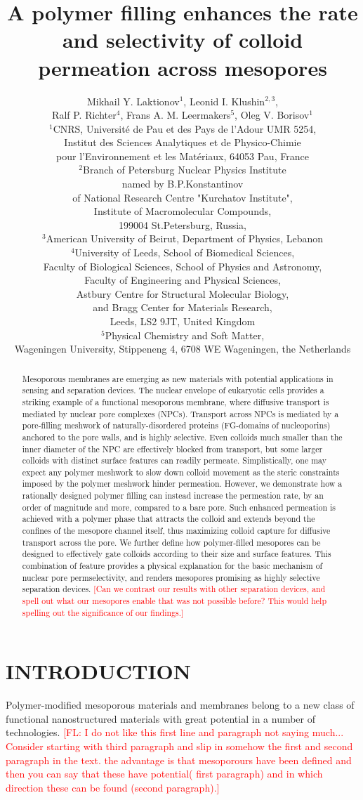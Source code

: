 \documentclass[12pt, a4paper]{article}
\title{A polymer filling enhances the rate and selectivity of colloid permeation across mesopores}
\author{Mikhail Y. Laktionov$^1$, Leonid I. Klushin$^{2,3}$,\\
Ralf P. Richter$^4$, Frans A. M. Leermakers$^5$, Oleg V. Borisov$^1$\\
$^{1}$CNRS, Universit\'e de Pau et des Pays de l'Adour UMR 5254,\\
Institut des Sciences Analytiques et de Physico-Chimie\\
pour l'Environnement et les Mat\'eriaux, 64053 Pau, France\\
$^{2}$Branch of Petersburg Nuclear Physics Institute\\
named by B.P.Konstantinov\\
of National Research Centre "Kurchatov Institute",\\
Institute of Macromolecular Compounds,\\
199004 St.Petersburg, Russia,\\
$^{3}$American University of Beirut, Department of Physics, Lebanon\\
$^{4}$University of Leeds, School of Biomedical Sciences,\\
Faculty of Biological Sciences, 
School of Physics and Astronomy,\\
Faculty of Engineering and Physical Sciences,\\  
Astbury Centre for Structural Molecular Biology,\\ 
and Bragg Center for Materials Research,\\ 
Leeds, LS2 9JT, United Kingdom\\
$^{5}$Physical Chemistry and Soft Matter,\\
Wageningen University, Stippeneng 4, 6708 WE Wageningen, the Netherlands\\
}
\date{}
\newcommand\todo[1]{\textcolor{red}{#1}}
\begin{document}
\maketitle

\begin{abstract}

Mesoporous membranes are emerging as new materials with potential applications in sensing and separation devices.
The nuclear envelope of eukaryotic cells provides a striking example of a functional mesoporous membrane, where diffusive transport is mediated by nuclear pore complexes (NPCs).
Transport across NPCs is mediated by a pore-filling meshwork of naturally-disordered proteins (FG-domains of nucleoporins) anchored to the pore walls, and is highly selective.
Even colloids much smaller than the inner diameter of the NPC are effectively blocked from transport, but some larger colloids with distinct surface features can readily permeate.
Simplistically, one may expect any polymer meshwork to slow down colloid movement as the steric constraints imposed by the polymer meshwork hinder permeation.
However, we demonstrate how a rationally designed polymer filling can instead increase the permeation rate, by an order of magnitude and more, compared to a bare pore.
Such enhanced permeation is achieved with a polymer phase that attracts the colloid and extends beyond the confines of the mesopore channel itself, thus maximizing colloid capture for diffusive transport across the pore.
We further define how polymer-filled mesopores can be designed to effectively gate colloids according to their size and surface features. 
This combination of feature provides a physical explanation for the basic mechanism of nuclear pore permselectivity, and renders mesopores promising as highly selective separation devices.
\todo{[Can we contrast our results with other separation devices, and spell out what our mesopores enable that was not possible before? This would help spelling out the significance of our findings.]}
\end{abstract}


\section{INTRODUCTION}

Polymer-modified mesoporous materials and membranes belong to a new class of functional nanostructured materials with great potential in a number of technologies.
\todo{[FL: I do not like this first line and paragraph not saying much... Consider starting with third paragraph and slip in somehow the first and second paragraph in the text. the advantage is that mesoporours have been defined and then you can say that these have potential( first paragraph) and in which direction these can be found (second paragraph).]}
\end{document}
